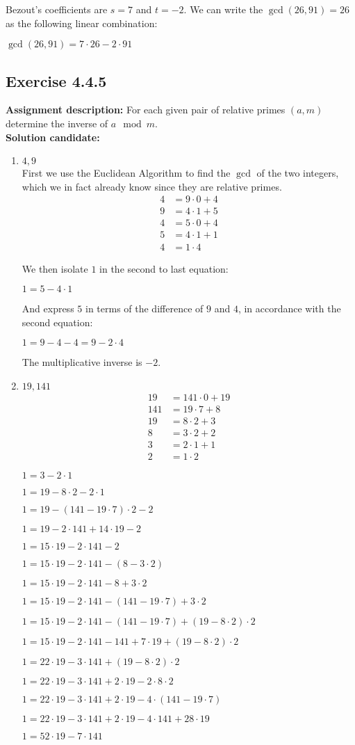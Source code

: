 \documentclass{report}
\newcommand{\cent}[1]{\begin{center}#1\end{center}}
\newcommand{\mAlign}[1]{\begin{align*}#1\end{align*}}
\newcommand{\assignmentDescription}{\textbf{Assignment description: }}
\newcommand{\solution}{\textbf{Solution candidate: }}
\newcommand{\Exercise}[1]{\subsection{Exercise #1}}
\newcommand{\defaultEnumerateLabel}{\textbf{\alph*.}}
\newcommand{\myItem}[1]{\item #1\\}
\begin{document}
\begin{enumerate}[label=\defaultEnumerateLabel]
	Bezout's coefficients are $s=7$ and $t=-2$. We can write the $\gcd(26,91) = 26$ as the following linear combination:
	
	\cent{$\gcd(26,91) = 7 \cdot 26 - 2 \cdot 91$}
	
	
	
	\Exercise{4.4.5}
	
	\assignmentDescription
	For each given pair of relative primes $(a,m)$ determine the inverse of $a \mod m$.\\
	
	\solution
	
	\begin{enumerate}[label=\defaultEnumerateLabel]
		\myItem{$4,9$}
		First we use the Euclidean Algorithm to find the $\gcd$ of the two integers, which we in fact already know since they are relative primes.
		\mAlign{
			4 &= 9 \cdot 0 + 4 \\
			9 &= 4 \cdot 1 + 5 \\
			4 &= 5 \cdot 0 +4 \\
			5 &= 4 \cdot 1 + 1 \\
			4 &= 1 \cdot 4
		}
	
		We then isolate $1$ in the second to last equation:
		
		\cent{$1 = 5 - 4 \cdot 1$}
		
		And express $5$ in terms of the difference of $9$ and $4$, in accordance with the second equation:
		
		\cent{$1 = 9-4 - 4= 9 -2 \cdot 4$}
		
		The multiplicative inverse is $-2$.\\
		
		\myItem{$19,141$}
		
		\mAlign{
			19 &= 141 \cdot 0 + 19 \\
			141 &= 19 \cdot 7 + 8 \\
			19 &= 8 \cdot 2 + 3 \\
			8 &= 3 \cdot 2 + 2 \\
			3 &= 2 \cdot 1 + 1 \\
			2 &= 1 \cdot 2 
		}
		
		\cent{$1 = 3 - 2 \cdot 1$}
		
		\cent{$1 = 19 - 8 \cdot 2 - 2 \cdot 1$}
		
		\cent{$1 = 19 - (141 - 19 \cdot 7) \cdot 2 - 2$}
		\cent{$1 = 19 - 2 \cdot 141 + 14 \cdot 19 - 2$}
		\cent{$1 = 15 \cdot 19 - 2 \cdot 141 - 2$}
		\cent{$1 = 15 \cdot 19 - 2 \cdot 141 - (8- 3 \cdot 2)$}
		\cent{$1 = 15 \cdot 19 - 2 \cdot 141 - 8 + 3 \cdot 2$}
		\cent{$1 = 15 \cdot 19 - 2 \cdot 141 - (141 - 19 \cdot 7) + 3 \cdot 2$}
		\cent{$1 = 15 \cdot 19 - 2 \cdot 141 - (141 - 19 \cdot 7) + (19 - 8 \cdot 2) \cdot 2$}
		\cent{$1 = 15 \cdot 19 - 2 \cdot 141 - 141 +  7 \cdot 19 + (19 - 8 \cdot 2) \cdot 2$}
		\cent{$1 = 22 \cdot 19 - 3 \cdot 141 +   (19 - 8 \cdot 2) \cdot 2$}
		\cent{$1 = 22 \cdot 19 - 3 \cdot 141 +  2 \cdot 19 - 2 \cdot 8 \cdot 2 $}
		\cent{$1 = 22 \cdot 19 - 3 \cdot 141 +  2 \cdot 19 - 4 \cdot (141 - 19 \cdot 7) $}
		\cent{$1 = 22 \cdot 19 - 3 \cdot 141 +  2 \cdot 19 - 4 \cdot 141 + 28 \cdot 19 $}
		\cent{$1 = 52 \cdot 19 - 7 \cdot 141 $}
		

\end{enumerate}
\end{enumerate}
\end{document}
